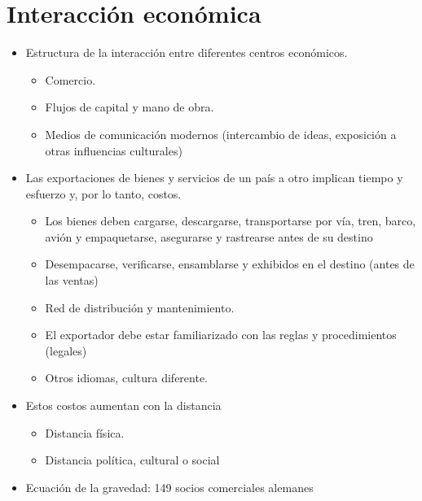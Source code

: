 
\section{Interacción económica}

\begin{itemize}
    \item Estructura de la interacción entre diferentes centros económicos.
    \begin{itemize}
	\item Comercio.
	\item Flujos de capital y mano de obra.
	\item Medios de comunicación modernos (intercambio de ideas, exposición a otras influencias culturales)
    \end{itemize}
\end{itemize}

\begin{itemize}
    \item Las exportaciones de bienes y servicios de un país a otro implican tiempo y esfuerzo y, por lo tanto, costos.
    \begin{itemize}
	\item Los bienes deben cargarse, descargarse, transportarse por vía, tren, barco, avión y empaquetarse, asegurarse y rastrearse antes de su destino
	\item Desempacarse, verificarse, ensamblarse y exhibidos en el destino (antes de las ventas)
	\item Red de distribución y mantenimiento.
	\item El exportador debe estar familiarizado con las reglas y procedimientos (legales) 
	\item Otros idiomas, cultura diferente. 
    \end{itemize}
    \item Estos costos aumentan con la distancia
    \begin{itemize}
	\item Distancia física.
	\item Distancia política, cultural o social      
    \end{itemize}
    \item Ecuación de la gravedad: 149 socios comerciales alemanes
\end{itemize}

